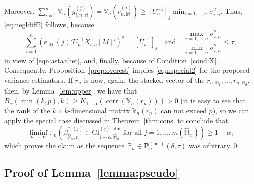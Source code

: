 \documentclass[preprint]{imsart}
\newcommand{\V}{{\mathbb V}}
\newcommand{\M}{\mathbb M}
\DeclareMathOperator{\corr}{corr}
\numberwithin{equation}{section}
\begin{document}
Moreover, $\sum_{i=1}^n \V_n(g_{i,n,\M}^{(j)})=\V_n(r_{n,\M}^{(j)}) \ge [U_n^{-1}]_j\min_{i=1,\dots, n}\sigma_{i,n}^2 $.
Thus, \eqref{eq:negldiff2} follows, because
$$
\sum_{i=1}^n(e_{|M|}(j)'U_n^{-1}X_{i,n}[M]')^2 = [U_n^{-1}]_j
\quad\text{and}\quad\frac{\max_{i=1,\dots, n}\sigma_{i,n}^2}{\min_{i=1,\dots, n}\sigma_{i,n}^2}\le \tau,
$$
in view of \eqref{eqn:astauhet}, and, finally, because of Condition~\ref{cond:X}. Consequently, Proposition~\ref{prop:overest} implies \eqref{eqn:special2} for the proposed variance estimators.
If $r_n$ is now, again, the stacked vector of the $r_{n,\M_1},\dots, r_{n,\M_d}$, then, by Lemma~\ref{lem:upper}, we have that $B_{\alpha}(\min(k, p),k) \geq K_{1-\alpha}(\corr(\mathbb{V}_n(r_n))) > 0$ (it is easy to see that the rank of the $k \times k$-dimensional matrix $\mathbb{V}_n(r_n)$ can not exceed $p$), so we can apply the special case discussed in Theorem~\ref{thm:cons} to conclude that 
%
\begin{equation}
\liminf_{n \to \infty}  \mathbb{P}_n \left(\beta_{\hat{\mathbb{M}}_n, n}^{*, (j)} \in \mathrm{CI}_{1-\alpha, \hat{\mathbb{M}}_n}^{(j), \mathrm{hlm}} \text{ for all } j = 1, \hdots, m(\hat{\mathbb{M}}_n)  \right) \geq 1-\alpha,
\end{equation}
%
which proves the claim as the sequence $\mathbb{P}_n \in \mathbf{P}_n^{(\mathrm{het})}(\delta, \tau)$ was arbitrary.\hfill\qed





\subsection{Proof of Lemma~\ref{lemma:pseudo}}
\label{sec:pseudo:proof}
\end{document}

